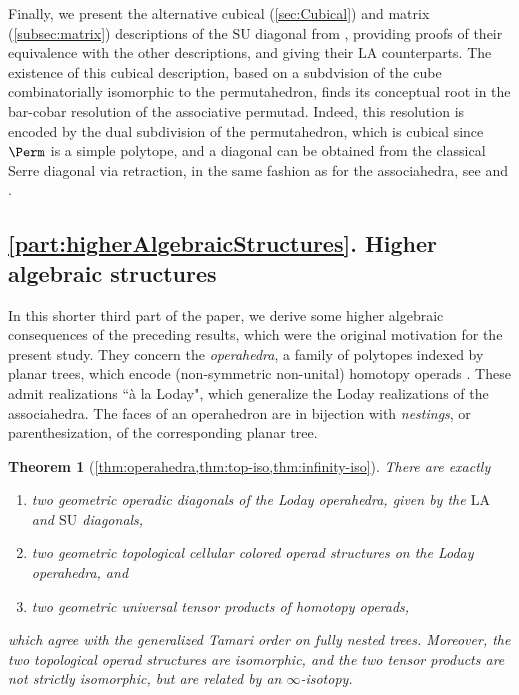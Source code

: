 \documentclass{amsart}
\newcommand{\Guillaume}[1]{\todo[color=magenta!30]{\rm #1 \\ \hfill --- G.}}
\newtheorem*{theorem*}{Theorem}
\theoremstyle{definition}
\newcommand{\SU}{\mathrm{SU}}
\newcommand{\LA}{\mathrm{LA}}
\begin{document}
Finally, we present the alternative cubical (\cref{sec:Cubical}) and matrix (\cref{subsec:matrix}) descriptions of the $\SU$ diagonal from \cite{SaneblidzeUmble,SaneblidzeUmble-comparingDiagonals}, providing proofs of their equivalence with the other descriptions, and giving their $\LA$ counterparts. 
The existence of this cubical description, based on a subdvision of the cube combinatorially isomorphic to the permutahedron, finds its conceptual root in the bar-cobar resolution of the associative permutad. 
Indeed, this resolution is encoded by the dual subdivision of the permutahedron, which is cubical since $\Perm$ is a simple polytope, and a diagonal can be obtained from the classical Serre diagonal via retraction, in the same fashion as for the associahedra, see \cite{MarklShnider} and \cite[Sec. 5.1]{LaplanteAnfossiMazuir}.


\pagebreak
\subsection*{\cref{part:higherAlgebraicStructures}. Higher algebraic structures}

\Guillaume{Add results multiplihedra}

In this shorter third part of the paper, we derive some higher algebraic consequences of the preceding results, which were the original motivation for the present study.
They concern the \emph{operahedra}, a family of polytopes indexed by planar trees, which encode (non-symmetric non-unital) homotopy operads \cite{LaplanteAnfossi}.
These admit realizations ``\`a la Loday", which generalize the Loday realizations of the associahedra. 
The faces of an operahedron are in bijection with \emph{nestings}, or parenthesization, of the corresponding planar tree. 

\begin{theorem*}[\cref{thm:operahedra,thm:top-iso,thm:infinity-iso}] 
There are exactly 
\begin{enumerate}
	\item two geometric operadic diagonals of the Loday operahedra, given by the $\LA$ and $\SU$ diagonals, 
	\item two geometric topological cellular colored operad structures on the Loday operahedra, and
	\item two geometric universal tensor products of homotopy operads,
\end{enumerate}
which agree with the generalized Tamari order on fully nested trees. 
Moreover, the two topological operad structures are isomorphic, and the two tensor products are not strictly isomorphic, but are related by an $\infty$-isotopy. 
\end{theorem*}
\end{document}
